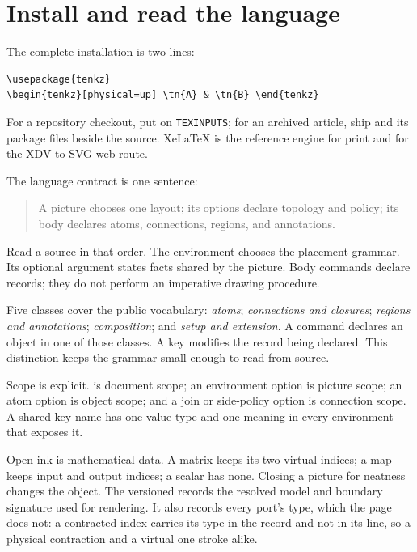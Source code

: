 \section{Install and read the language}\label{ch:install}

The complete installation is two lines:

\begin{Verbatim}[fontsize=\small,frame=leftline]
\usepackage{tenkz}
\begin{tenkz}[physical=up] \tn{A} & \tn{B} \end{tenkz}
\end{Verbatim}

For a repository checkout, put  on
\texttt{TEXINPUTS}; for an archived article, ship  and
its package files beside the source.  XeLaTeX is the reference engine for
print and for the XDV-to-SVG web route.

The language contract is one sentence:

\begin{quote}\large
A picture chooses one layout; its options declare topology and policy; its
body declares atoms, connections, regions, and annotations.
\end{quote}

Read a source in that order.  The environment chooses the placement grammar.
Its optional argument states facts shared by the picture.  Body commands
declare records; they do not perform an imperative drawing procedure.

Five classes cover the public vocabulary: \emph{atoms}; \emph{connections
and closures}; \emph{regions and annotations}; \emph{composition}; and
\emph{setup and extension}.  A command declares an object in one of those
classes.  A key modifies the record being declared.  This distinction keeps
the grammar small enough to read from source.

Scope is explicit.   is document scope; an environment option is
picture scope; an atom option is object scope; and a join or side-policy
option is connection scope.  A shared key name has one value type and one
meaning in every environment that exposes it.

Open ink is mathematical data.  A matrix keeps its two virtual indices; a
map keeps input and output indices; a scalar has none.  Closing a picture for
neatness changes the object.  The versioned  records the
resolved model and boundary signature used for rendering.  It also records
every port's type, which the page does not: a contracted index carries its
type in the record and not in its line, so a physical contraction and a
virtual one stroke alike.
